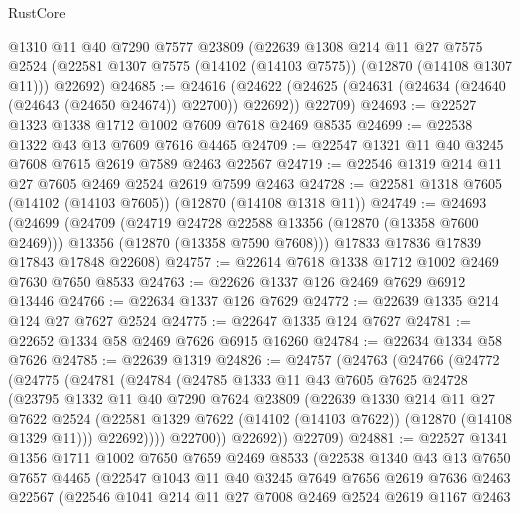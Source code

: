 \begin{lexlean}{RustCore}
\begin{coremodule}
    @1310
    @11
    @40
    @7290
    @7577
    @23809
    (@22639
      @1308
      @214
      @11
      @27
      @7575
      @2524
      (@22581 @1307 @7575 (@14102 (@14103 @7575)) (@12870 (@14108 @1307 @11)))
      @22692)
@24685 := @24616
    (@24622 (@24625 (@24631 (@24634 (@24640 (@24643 (@24650 @24674)) @22700)) @22692)) @22709)
@24693 := @22527 @1323 @1338 @1712 @1002 @7609 @7618 @2469 @8535
@24699 := @22538 @1322 @43 @13 @7609 @7616 @4465
@24709 := @22547 @1321 @11 @40 @3245 @7608 @7615 @2619 @7589 @2463 @22567
@24719 := @22546 @1319 @214 @11 @27 @7605 @2469 @2524 @2619 @7599 @2463
@24728 := @22581 @1318 @7605 (@14102 (@14103 @7605)) (@12870 (@14108 @1318 @11))
@24749 := @24693
    (@24699
      (@24709
        (@24719 @24728 @22588 @13356 (@12870 (@13358 @7600 @2469)))
        @13356
        (@12870 (@13358 @7590 @7608)))
      @17833
      @17836
      @17839
      @17843
      @17848
      @22608)
@24757 := @22614 @7618 @1338 @1712 @1002 @2469 @7630 @7650 @8533
@24763 := @22626 @1337 @126 @2469 @7629 @6912 @13446
@24766 := @22634 @1337 @126 @7629
@24772 := @22639 @1335 @214 @124 @27 @7627 @2524
@24775 := @22647 @1335 @124 @7627
@24781 := @22652 @1334 @58 @2469 @7626 @6915 @16260
@24784 := @22634 @1334 @58 @7626
@24785 := @22639 @1319
@24826 := @24757
    (@24763
      (@24766
        (@24772
          (@24775
            (@24781
              (@24784
                (@24785
                  @1333
                  @11
                  @43
                  @7605
                  @7625
                  @24728
                  (@23795
                    @1332
                    @11
                    @40
                    @7290
                    @7624
                    @23809
                    (@22639
                      @1330
                      @214
                      @11
                      @27
                      @7622
                      @2524
                      (@22581 @1329 @7622 (@14102 (@14103 @7622)) (@12870 (@14108 @1329 @11)))
                      @22692))))
              @22700))
          @22692))
      @22709)
@24881 := @22527
    @1341
    @1356
    @1711
    @1002
    @7650
    @7659
    @2469
    @8533
    (@22538
      @1340
      @43
      @13
      @7650
      @7657
      @4465
      (@22547
        @1043
        @11
        @40
        @3245
        @7649
        @7656
        @2619
        @7636
        @2463
        @22567
        (@22546
          @1041
          @214
          @11
          @27
          @7008
          @2469
          @2524
          @2619
          @1167
          @2463

\end{coremodule}
\end{lexlean}
